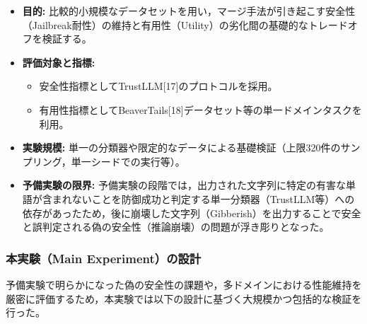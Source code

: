 \documentclass{article}
\begin{document}
\begin{itemize}
    \item \textbf{目的:}
    比較的小規模なデータセットを用い，マージ手法が引き起こす安全性（Jailbreak耐性）の維持と有用性（Utility）の劣化間の基礎的なトレードオフを検証する。
    \item \textbf{評価対象と指標:}
    \begin{itemize}
        \item 安全性指標としてTrustLLM[17]のプロトコルを採用。
        \item 有用性指標としてBeaverTails[18]データセット等の単一ドメインタスクを利用。
    \end{itemize}
    \item \textbf{実験規模:}
    単一の分類器や限定的なデータによる基礎検証（上限320件のサンプリング，単一シードでの実行等）。
    \item \textbf{予備実験の限界:}
    予備実験の段階では，出力された文字列に特定の有害な単語が含まれないことを防御成功と判定する単一分類器（TrustLLM等）への依存があったため，後に崩壊した文字列（Gibberish）を出力することで安全と誤判定される偽の安全性（推論崩壊）の問題が浮き彫りとなった。
\end{itemize}

\subsubsection{本実験（Main Experiment）の設計}
予備実験で明らかになった偽の安全性の課題や，多ドメインにおける性能維持を厳密に評価するため，本実験では以下の設計に基づく大規模かつ包括的な検証を行った。
\end{document}
